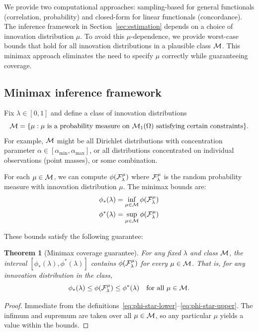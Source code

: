 \documentclass{article}
\newtheorem{theorem}{Theorem}
\begin{document}
We provide two computational approaches: sampling-based for general functionals (correlation, probability) and closed-form for linear functionals (concordance). The inference framework in Section~\ref{sec:estimation} depends on a choice of innovation distribution $\mu$. To avoid this $\mu$-dependence, we provide worst-case bounds that hold for all innovation distributions in a plausible class $\mathcal{M}$. This minimax approach eliminates the need to specify $\mu$ correctly while guaranteeing coverage.

\subsection{Minimax inference framework}

Fix $\lambda \in [0,1]$ and define a class of innovation distributions
\[
    \mathcal{M} = \{\mu : \text{$\mu$ is a probability measure on $\mathcal{M}_1(\Omega)$ satisfying certain constraints}\}.
\]
For example, $\mathcal{M}$ might be all Dirichlet distributions with concentration parameter $\alpha \in [\alpha_{\min}, \alpha_{\max}]$, or all distributions concentrated on individual observations (point masses), or some combination.

For each $\mu \in \mathcal{M}$, we can compute $\phi(\mathcal{F}_\lambda^\mu)$ where $\mathcal{F}_\lambda^\mu$ is the random probability measure with innovation distribution $\mu$. The minimax bounds are:
\begin{align}
    \phi_*(\lambda) &= \inf_{\mu \in \mathcal{M}} \phi(\mathcal{F}_\lambda^\mu) \label{eq:phi-star-lower}\\
    \phi^*(\lambda) &= \sup_{\mu \in \mathcal{M}} \phi(\mathcal{F}_\lambda^\mu) \label{eq:phi-star-upper}
\end{align}

These bounds satisfy the following guarantee:

\begin{theorem}[Minimax coverage guarantee]\label{thm:minimax}
For any fixed $\lambda$ and class $\mathcal{M}$, the interval $[\phi_*(\lambda), \phi^*(\lambda)]$ contains $\phi(\mathcal{F}_\lambda^\mu)$ for \emph{every} $\mu \in \mathcal{M}$. That is, for any innovation distribution in the class,
\[
    \phi_*(\lambda) \leq \phi(\mathcal{F}_\lambda^\mu) \leq \phi^*(\lambda) \quad \text{for all } \mu \in \mathcal{M}.
\]
\end{theorem}

\begin{proof}
Immediate from the definitions~\eqref{eq:phi-star-lower}--\eqref{eq:phi-star-upper}. The infimum and supremum are taken over all $\mu \in \mathcal{M}$, so any particular $\mu$ yields a value within the bounds.
\end{proof}
\end{document}
